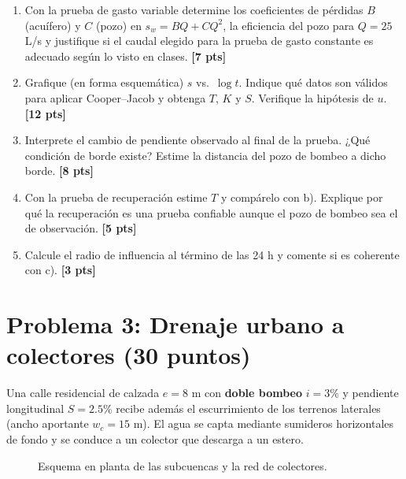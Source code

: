 \documentclass[11pt,letterpaper]{article}
\newcommand{\pts}[1]{\hfill\textbf{[#1 pts]}}
\begin{document}
\begin{enumerate}[label=\alph*)]
\item Con la prueba de gasto variable determine los coeficientes de pérdidas $B$ (acuífero) y $C$ (pozo) en $s_w=BQ+CQ^2$, la eficiencia del pozo para $Q=25$ L/s y justifique si el caudal elegido para la prueba de gasto constante es adecuado según lo visto en clases. \pts{7}
\item Grafique (en forma esquemática) $s$ vs.\ $\log t$. Indique qué datos son válidos para aplicar Cooper--Jacob y obtenga $T$, $K$ y $S$. Verifique la hipótesis de $u$. \pts{12}
\item Interprete el cambio de pendiente observado al final de la prueba. ¿Qué condición de borde existe? Estime la distancia del pozo de bombeo a dicho borde. \pts{8}
\item Con la prueba de recuperación estime $T$ y compárelo con b). Explique por qué la recuperación es una prueba confiable aunque el pozo de bombeo sea el de observación. \pts{5}
\item Calcule el radio de influencia al término de las 24 h y comente si es coherente con c). \pts{3}
\end{enumerate}

\section*{Problema 3: Drenaje urbano a colectores (30 puntos)}

Una calle residencial de calzada $e=8$ m con \textbf{doble bombeo} $i=3\%$ y pendiente longitudinal
$S=2.5\%$ recibe además el escurrimiento de los terrenos laterales (ancho aportante $w_c=15$ m).
El agua se capta mediante sumideros horizontales de fondo y se conduce a un colector que descarga
a un estero.

\begin{figure}[H]
\centering
{}
\caption{Esquema en planta de las subcuencas y la red de colectores.}
\end{figure}
\end{document}
